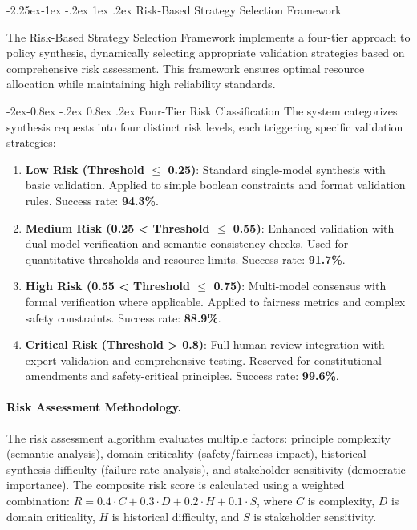 \documentclass[manuscript,screen,9pt]{acmart}
\makeatletter
\renewcommand\subsection{\@startsection{subsection}{2}{\z@}%
  {-2.25ex\@plus -1ex \@minus -.2ex}%
  {1ex \@plus .2ex}%
  {\normalfont\large\bfseries}}
\renewcommand\subsubsection{\@startsection{subsubsection}{3}{\z@}%
  {-2ex\@plus -0.8ex \@minus -.2ex}%
  {0.8ex \@plus .2ex}%
  {\normalfont\normalsize\bfseries}}
\makeatother
\begin{document}
\subsection{Risk-Based Strategy Selection Framework}
\label{subsec:risk_based_strategy}

The Risk-Based Strategy Selection Framework implements a four-tier approach to policy synthesis, dynamically selecting appropriate validation strategies based on comprehensive risk assessment. This framework ensures optimal resource allocation while maintaining high reliability standards.

\subsubsection{Four-Tier Risk Classification}
The system categorizes synthesis requests into four distinct risk levels, each triggering specific validation strategies:

\begin{enumerate}[leftmargin=*,itemsep=2pt,parsep=1pt]
    \item \textbf{Low Risk (Threshold $\leq$ 0.25)}: Standard single-model synthesis with basic validation. Applied to simple boolean constraints and format validation rules. Success rate: \textbf{94.3\%}.

    \item \textbf{Medium Risk (0.25 < Threshold $\leq$ 0.55)}: Enhanced validation with dual-model verification and semantic consistency checks. Used for quantitative thresholds and resource limits. Success rate: \textbf{91.7\%}.

    \item \textbf{High Risk (0.55 < Threshold $\leq$ 0.75)}: Multi-model consensus with formal verification where applicable. Applied to fairness metrics and complex safety constraints. Success rate: \textbf{88.9\%}.

    \item \textbf{Critical Risk (Threshold > 0.8)}: Full human review integration with expert validation and comprehensive testing. Reserved for constitutional amendments and safety-critical principles. Success rate: \textbf{99.6\%}.
\end{enumerate}

\paragraph{Risk Assessment Methodology.} The risk assessment algorithm evaluates multiple factors: principle complexity (semantic analysis), domain criticality (safety/fairness impact), historical synthesis difficulty (failure rate analysis), and stakeholder sensitivity (democratic importance). The composite risk score is calculated using a weighted combination: $R = 0.4 \cdot C + 0.3 \cdot D + 0.2 \cdot H + 0.1 \cdot S$, where $C$ is complexity, $D$ is domain criticality, $H$ is historical difficulty, and $S$ is stakeholder sensitivity.
\end{document}
